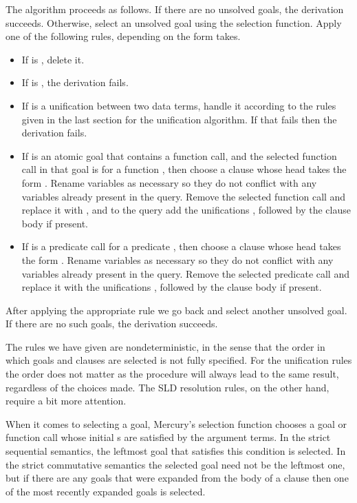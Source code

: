 The algorithm proceeds as follows.
If there are no unsolved goals, the derivation succeeds.
Otherwise, select an unsolved goal 
using the selection function.
Apply one of the following rules,
depending on the form  takes.
\begin{itemize}
\item
If  is ,
delete it.
\item
If  is ,
the derivation fails.
\item
If  is
a unification between two data terms,
handle it according to the rules
given in the last section
for the unification algorithm.
If that fails then the derivation fails.
\item
If  is an atomic goal
that contains a function call,
and the selected function call in that goal is
 for a function ,
then choose a clause
whose head takes the form .
Rename variables as necessary so
they do not conflict with
any variables already present in the query.
Remove the selected function call
and replace it with ,
and to the query add
the unifications ,
followed by the clause body if present.
\item
If  is
a predicate call 
for a predicate ,
then choose a clause
whose head takes the form .
Rename variables as necessary so
they do not conflict with
any variables already present in the query.
Remove the selected predicate call
and replace it with
the unifications ,
followed by the clause body if present.
\end{itemize}
After applying the appropriate rule
we go back and select another unsolved goal.
If there are no such goals,
the derivation succeeds.

The rules we have given are nondeterministic,
in the sense that
the order in which goals and clauses are selected
is not fully specified.
For the unification rules the order does not matter
as the procedure will always lead to the same result,
regardless of the choices made.
The SLD resolution rules, on the other hand,
require a bit more attention.

When it comes to selecting a goal,
Mercury's selection function chooses a goal or function call
whose initial s
are satisfied by the argument terms.
In the strict sequential semantics,
the leftmost goal that satisfies this condition is selected.
In the strict commutative semantics
the selected goal need not be the leftmost one,
but if there are any goals
that were expanded from the body of a clause
then one of the most recently expanded goals is selected.

